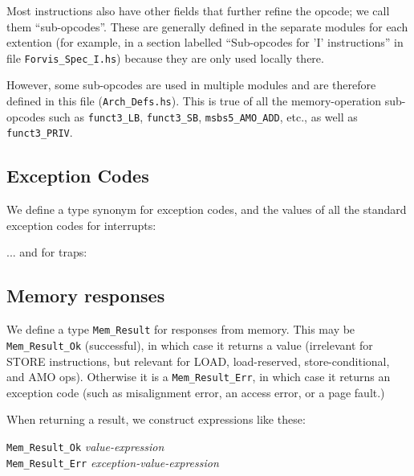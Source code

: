 \documentclass[11pt]{article}
\newcommand{\hm}{\hspace*{1em}}
\newcommand{\hmmm}{\hspace*{3em}}
\begin{document}
Most instructions also have other fields that further refine the
opcode; we call them ``sub-opcodes''.  These are generally defined in
the separate modules for each extention (for example, in a section
labelled ``Sub-opcodes for 'I' instructions'' in file
\verb|Forvis_Spec_I.hs|) because they are only used locally there.

However, some sub-opcodes are used in multiple modules and are
therefore defined in this file (\verb|Arch_Defs.hs|).  This is true of
all the memory-operation sub-opcodes such as \verb|funct3_LB|,
\verb|funct3_SB|, \verb|msbs5_AMO_ADD|, etc., as well as
\verb|funct3_PRIV|.


\subsection{Exception Codes}

We define a type synonym for exception codes, and the values of all
the standard exception codes for interrupts:



... and for traps:




\subsection{Memory responses}

We define a type {\tt Mem\_Result} for responses from memory.  This
may be {\tt Mem\_Result\_Ok} (successful), in which case it returns a
value (irrelevant for STORE instructions, but relevant for LOAD,
load-reserved, store-conditional, and AMO ops).  Otherwise it is a
{\tt Mem\_Result\_Err}, in which case it returns an exception code
(such as misalignment error, an access error, or a page fault.)



When returning a result, we construct expressions like these:
\begin{tabbing}
\hmmm \= {\tt Mem\_Result\_Ok} \hm \= \emph{value-expression} \\
      \> {\tt Mem\_Result\_Err}    \> \emph{exception-value-expression}
\end{tabbing}
\end{document}
